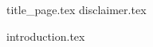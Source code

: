 \documentclass{article}
\begin{document}
  \onehalfspacing
  \setlength{\parskip}{1.5em} 


  {title_page.tex}
  {disclaimer.tex}
  


  \tableofcontents

  \newpage


  {introduction.tex}
\end{document}
